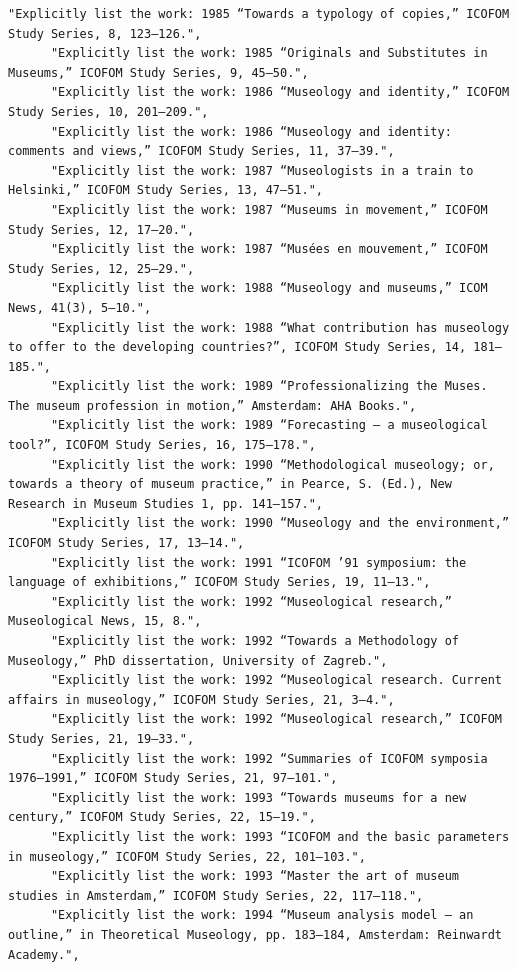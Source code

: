 \documentclass[11pt]{article}
\begin{document}
\begin{tcolorbox}[
  breakable,
  colback=porcelain,
  colframe=gray!75!black,
  left=6pt, right=6pt, top=6pt, bottom=6pt,
  fontupper=\small
]
\begin{lstlisting}[basicstyle=\ttfamily\footnotesize, breaklines=true, frame=none, numbers=none]
      "Explicitly list the work: 1985 “Towards a typology of copies,” ICOFOM Study Series, 8, 123–126.",
      "Explicitly list the work: 1985 “Originals and Substitutes in Museums,” ICOFOM Study Series, 9, 45–50.",
      "Explicitly list the work: 1986 “Museology and identity,” ICOFOM Study Series, 10, 201–209.",
      "Explicitly list the work: 1986 “Museology and identity: comments and views,” ICOFOM Study Series, 11, 37–39.",
      "Explicitly list the work: 1987 “Museologists in a train to Helsinki,” ICOFOM Study Series, 13, 47–51.",
      "Explicitly list the work: 1987 “Museums in movement,” ICOFOM Study Series, 12, 17–20.",
      "Explicitly list the work: 1987 “Musées en mouvement,” ICOFOM Study Series, 12, 25–29.",
      "Explicitly list the work: 1988 “Museology and museums,” ICOM News, 41(3), 5–10.",
      "Explicitly list the work: 1988 “What contribution has museology to offer to the developing countries?”, ICOFOM Study Series, 14, 181–185.",
      "Explicitly list the work: 1989 “Professionalizing the Muses. The museum profession in motion,” Amsterdam: AHA Books.",
      "Explicitly list the work: 1989 “Forecasting – a museological tool?”, ICOFOM Study Series, 16, 175–178.",
      "Explicitly list the work: 1990 “Methodological museology; or, towards a theory of museum practice,” in Pearce, S. (Ed.), New Research in Museum Studies 1, pp. 141–157.",
      "Explicitly list the work: 1990 “Museology and the environment,” ICOFOM Study Series, 17, 13–14.",
      "Explicitly list the work: 1991 “ICOFOM ’91 symposium: the language of exhibitions,” ICOFOM Study Series, 19, 11–13.",
      "Explicitly list the work: 1992 “Museological research,” Museological News, 15, 8.",
      "Explicitly list the work: 1992 “Towards a Methodology of Museology,” PhD dissertation, University of Zagreb.",
      "Explicitly list the work: 1992 “Museological research. Current affairs in museology,” ICOFOM Study Series, 21, 3–4.",
      "Explicitly list the work: 1992 “Museological research,” ICOFOM Study Series, 21, 19–33.",
      "Explicitly list the work: 1992 “Summaries of ICOFOM symposia 1976–1991,” ICOFOM Study Series, 21, 97–101.",
      "Explicitly list the work: 1993 “Towards museums for a new century,” ICOFOM Study Series, 22, 15–19.",
      "Explicitly list the work: 1993 “ICOFOM and the basic parameters in museology,” ICOFOM Study Series, 22, 101–103.",
      "Explicitly list the work: 1993 “Master the art of museum studies in Amsterdam,” ICOFOM Study Series, 22, 117–118.",
      "Explicitly list the work: 1994 “Museum analysis model – an outline,” in Theoretical Museology, pp. 183–184, Amsterdam: Reinwardt Academy.",

\end{lstlisting}
\end{tcolorbox}
\end{document}
